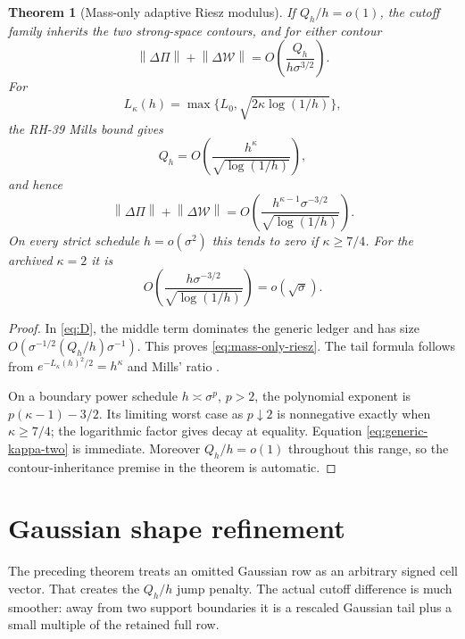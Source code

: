 \documentclass[11pt]{article}
\newtheorem{theorem}{Theorem}[section]
\theoremstyle{remark}
\newcommand{\cW}{\mathcal W}
\newcommand{\norm}[1]{\left\lVert #1\right\rVert}
\begin{document}
\begin{theorem}[Mass-only adaptive Riesz modulus]
\label{thm:mass-only}
If $Q_h/h=o(1)$, the cutoff family inherits the two strong-space contours,
and for either contour
\begin{equation}
 \norm{\Delta\Pi}+\norm{\Delta\cW}
 =O\!\left(\frac{Q_h}{h\sigma^{3/2}}\right).
 \label{eq:mass-only-riesz}
\end{equation}
For
\[
 L_\kappa(h)=\max\{L_0,\sqrt{2\kappa\log(1/h)}\},
\]
the RH-39 Mills bound gives
\[
 Q_h=O\!\left(
 \frac{h^\kappa}{\sqrt{\log(1/h)}}
 \right),
\]
and hence
\begin{equation}
 \norm{\Delta\Pi}+\norm{\Delta\cW}
 =O\!\left(
 \frac{h^{\kappa-1}\sigma^{-3/2}}
 {\sqrt{\log(1/h)}}
 \right).
 \label{eq:generic-adaptive}
\end{equation}
On every strict schedule $h=o(\sigma^2)$ this tends to zero if
$\kappa\ge7/4$.  For the archived $\kappa=2$ it is
\begin{equation}
 O\!\left(\frac{h\sigma^{-3/2}}
 {\sqrt{\log(1/h)}}\right)=o(\sqrt\sigma).
 \label{eq:generic-kappa-two}
\end{equation}
\end{theorem}

\begin{proof}
In \eqref{eq:D}, the middle term dominates the generic ledger and has size
$O(\sigma^{-1/2}(Q_h/h)\sigma^{-1})$.  This proves
\eqref{eq:mass-only-riesz}.  The tail formula follows from
$e^{-L_\kappa(h)^2/2}=h^\kappa$ and Mills' ratio
\citep{WangCutoff2026}.

On a boundary power schedule $h\asymp\sigma^p$, $p>2$, the polynomial
exponent is $p(\kappa-1)-3/2$.  Its limiting worst case as $p\downarrow2$
is nonnegative exactly when $\kappa\ge7/4$; the logarithmic factor gives
decay at equality.  Equation \eqref{eq:generic-kappa-two} is immediate.
Moreover $Q_h/h=o(1)$ throughout this range, so the contour-inheritance
premise in the theorem is automatic.
\end{proof}

\section{Gaussian shape refinement}

The preceding theorem treats an omitted Gaussian row as an arbitrary signed
cell vector.  That creates the $Q_h/h$ jump penalty.  The actual cutoff
difference is much smoother: away from two support boundaries it is a
rescaled Gaussian tail plus a small multiple of the retained full row.
\end{document}
